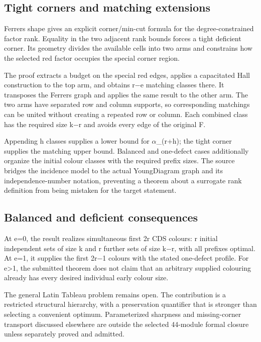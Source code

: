 \documentclass[11pt,a4paper]{article}
\begin{document}
\subsection{Tight corners and matching extensions}
Ferrers shape gives an explicit corner/min-cut formula for the degree-constrained factor rank. Equality in the two adjacent rank bounds forces a tight deficient corner. Its geometry divides the available cells into two arms and constrains how the selected red factor occupies the special corner region.

The proof extracts a budget on the special red edges, applies a capacitated Hall construction to the top arm, and obtains r\ensuremath{-}e matching classes there. It transposes the Ferrers graph and applies the same result to the other arm. The two arms have separated row and column supports, so corresponding matchings can be united without creating a repeated row or column. Each combined class has the required size k\ensuremath{-}r and avoids every edge of the original F.

Appending h classes supplies a lower bound for \ensuremath{\alpha}\_(r+h); the tight corner supplies the matching upper bound. Balanced and one-defect cases additionally organize the initial colour classes with the required prefix sizes. The source bridges the incidence model to the actual YoungDiagram graph and its independence-number notation, preventing a theorem about a surrogate rank definition from being mistaken for the target statement.

\subsection{Balanced and deficient consequences}
At e=0, the result realizes simultaneous first 2r CDS colours: r initial independent sets of size k and r further sets of size k\ensuremath{-}r, with all prefixes optimal. At e=1, it supplies the first 2r\ensuremath{-}1 colours with the stated one-defect profile. For e>1, the submitted theorem does not claim that an arbitrary supplied colouring already has every desired individual early colour size.

The general Latin Tableau problem remains open. The contribution is a restricted structural hierarchy, with a preservation quantifier that is stronger than selecting a convenient optimum. Parameterized sharpness and missing-corner transport discussed elsewhere are outside the selected 44-module formal closure unless separately proved and admitted.
\end{document}
